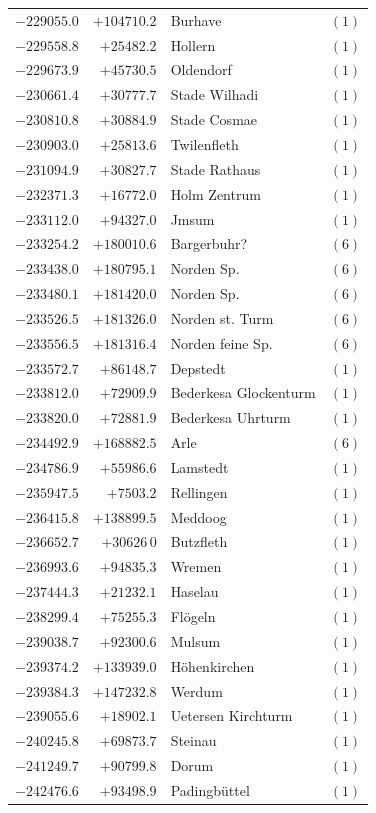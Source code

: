 \begin{center}
\begin{tabular}{r|r|p{170pt}|r}
\(-229055.0\)&\(+104710.2\)&Burhave&\((1)\)\\
\(-229558.8\)&\(+25482.2\)&Hollern&\((1)\)\\
\(-229673.9\)&\(+45730.5\)&Oldendorf&\((1)\)\\
\(-230661.4\)&\(+30777.7\)&Stade Wilhadi&\((1)\)\\
\(-230810.8\)&\(+30884.9\)&Stade Cosmae&\((1)\)\\
\(-230903.0\)&\(+25813.6\)&Twilenfleth&\((1)\)\\
\(-231094.9\)&\(+30827.7\)&Stade Rathaus&\((1)\)\\
\(-232371.3\)&\(+16772.0\)&Holm Zentrum&\((1)\)\\
\(-233112.0\)&\(+94327.0\)&Jmsum&\((1)\)\\
\(-233254.2\)&\(+180010.6\)&Bargerbuhr?&\((6)\)\\
\(-233438.0\)&\(+180795.1\)&Norden Sp.&\((6)\)\\
\(-233480.1\)&\(+181420.0\)&Norden Sp.&\((6)\)\\
\(-233526.5\)&\(+181326.0\)&Norden st. Turm&\((6)\)\\
\(-233556.5\)&\(+181316.4\)&Norden feine Sp.&\((6)\)\\
\(-233572.7\)&\(+86148.7\)&Depstedt&\((1)\)\\
\(-233812.0\)&\(+72909.9\)&Bederkesa Glockenturm&\((1)\)\\
\(-233820.0\)&\(+72881.9\)&Bederkesa Uhrturm&\((1)\)\\
\(-234492.9\)&\(+168882.5\)&Arle&\((6)\)\\
\(-234786.9\)&\(+55986.6\)&Lamstedt&\((1)\)\\
\(-235947.5\)&\(+7503.2\)&Rellingen&\((1)\)\\
\(-236415.8\)&\(+138899.5\)&Meddoog&\((1)\)\\
\(-236652.7\)&\(+30626\,0\)&Butzfleth&\((1)\)\\
\(-236993.6\)&\(+94835.3\)&Wremen&\((1)\)\\
\(-237444.3\)&\(+21232.1\)&Haselau&\((1)\)\\
\(-238299.4\)&\(+75255.3\)&Flögeln&\((1)\)\\
\(-239038.7\)&\(+92300.6\)&Mulsum&\((1)\)\\
\(-239374.2\)&\(+133939.0\)&Höhenkirchen&\((1)\)\\
\(-239384.3\)&\(+147232.8\)&Werdum&\((1)\)\\
\(-239055.6\)&\(+18902.1\)&Uetersen Kirchturm&\((1)\)\\
\(-240245.8\)&\(+69873.7\)&Steinau&\((1)\)\\
\(-241249.7\)&\(+90799.8\)&Dorum&\((1)\)\\
\(-242476.6\)&\(+93498.9\)&Padingbüttel&\((1)\)\\
\hline\end{tabular}\endgroup\end{center}
